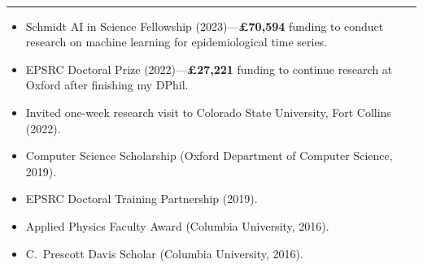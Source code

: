 \documentclass[10pt]{article}
\begin{document}
\vspace{-2.75mm} \\
\rule{\textwidth}{0.4pt}
\vspace{-.65cm}
\begin{itemize}[leftmargin=*]
\setlength{\itemsep}{4pt}
\setlength{\parskip}{0pt}
\setlength{\parsep}{0pt}
\item Schmidt AI in Science Fellowship (2023)---\textbf{£70,594} funding to conduct research on machine learning for epidemiological time series.
\item EPSRC Doctoral Prize (2022)---\textbf{£27,221} funding to continue research at Oxford after finishing my DPhil.
\item Invited one-week research visit to Colorado State University, Fort Collins (2022).
\item Computer Science Scholarship (Oxford Department of Computer Science, 2019).
\item EPSRC Doctoral Training Partnership (2019).
\item Applied Physics Faculty Award (Columbia University, 2016).
\item C.\ Prescott Davis Scholar (Columbia University, 2016).
\end{itemize}

\vspace{0.6cm}
\end{document}
